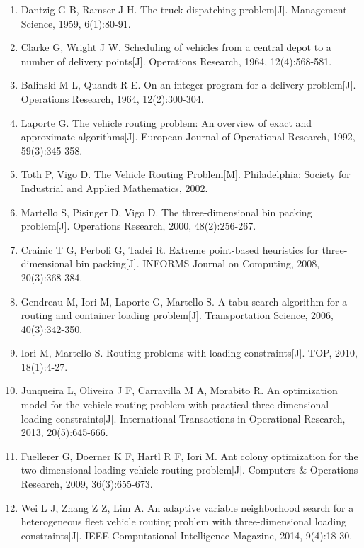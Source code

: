 ﻿\documentclass[UTF8,a4paper,12pt]{ctexart}
\begin{document}
	\vspace{0.5em}
	
	\begin{enumerate}
		\item[{[1]}] Dantzig G B, Ramser J H. The truck dispatching problem[J]. Management Science, 1959, 6(1):80-91.
		
		\item[{[2]}] Clarke G, Wright J W. Scheduling of vehicles from a central depot to a number of delivery points[J]. Operations Research, 1964, 12(4):568-581.
		
		\item[{[3]}] Balinski M L, Quandt R E. On an integer program for a delivery problem[J]. Operations Research, 1964, 12(2):300-304.
		
		\item[{[4]}] Laporte G. The vehicle routing problem: An overview of exact and approximate algorithms[J]. European Journal of Operational Research, 1992, 59(3):345-358.
		
		\item[{[5]}] Toth P, Vigo D. The Vehicle Routing Problem[M]. Philadelphia: Society for Industrial and Applied Mathematics, 2002.
		
		\item[{[6]}] Martello S, Pisinger D, Vigo D. The three-dimensional bin packing problem[J]. Operations Research, 2000, 48(2):256-267.
		
		\item[{[7]}] Crainic T G, Perboli G, Tadei R. Extreme point-based heuristics for three-dimensional bin packing[J]. INFORMS Journal on Computing, 2008, 20(3):368-384.
		
		\item[{[8]}] Gendreau M, Iori M, Laporte G, Martello S. A tabu search algorithm for a routing and container loading problem[J]. Transportation Science, 2006, 40(3):342-350.
		
		\item[{[9]}] Iori M, Martello S. Routing problems with loading constraints[J]. TOP, 2010, 18(1):4-27.
		
		\item[{[10]}] Junqueira L, Oliveira J F, Carravilla M A, Morabito R. An optimization model for the vehicle routing problem with practical three-dimensional loading constraints[J]. International Transactions in Operational Research, 2013, 20(5):645-666.
		
		\item[{[11]}] Fuellerer G, Doerner K F, Hartl R F, Iori M. Ant colony optimization for the two-dimensional loading vehicle routing problem[J]. Computers \& Operations Research, 2009, 36(3):655-673.
		
		\item[{[12]}] Wei L J, Zhang Z Z, Lim A. An adaptive variable neighborhood search for a heterogeneous fleet vehicle routing problem with three-dimensional loading constraints[J]. IEEE Computational Intelligence Magazine, 2014, 9(4):18-30.
	\end{enumerate}
	
\end{document}
